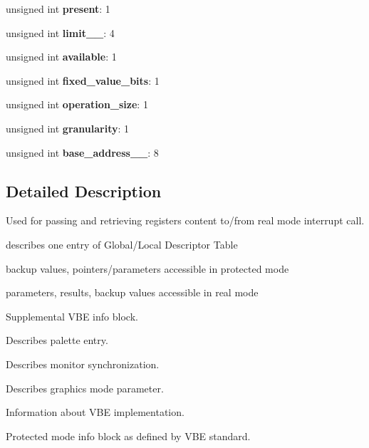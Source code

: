 \begin{DoxyCompactItemize}
unsigned int {\bfseries present}\+: 1
\item 
\mbox{\label{structRTEMS__PACKED_a52fa5625b69125080d5077fee072a4ec}} 
unsigned int {\bfseries limit\+\_\+\_}\+: 4
\item 
\mbox{\label{structRTEMS__PACKED_a65ab06c60cf82e67d5e989aa7ee6cf2e}} 
unsigned int {\bfseries available}\+: 1
\item 
\mbox{\label{structRTEMS__PACKED_a96b6c9336ce41072062f696217e41a90}} 
unsigned int {\bfseries fixed\+\_\+value\+\_\+bits}\+: 1
\item 
\mbox{\label{structRTEMS__PACKED_acee009cab698c395d443cf5c54926635}} 
unsigned int {\bfseries operation\+\_\+size}\+: 1
\item 
\mbox{\label{structRTEMS__PACKED_ad3814040f6b919bc38586f3c3c2f4dc9}} 
unsigned int {\bfseries granularity}\+: 1
\item 
\mbox{\label{structRTEMS__PACKED_a5d2fa401110e29c0ed42a0b151d53831}} 
unsigned int {\bfseries base\+\_\+address\+\_\+\_}\+: 8
\end{DoxyCompactItemize}


\subsection{Detailed Description}
Used for passing and retrieving registers content to/from real mode interrupt call. 

describes one entry of Global/\+Local Descriptor Table

backup values, pointers/parameters accessible in protected mode

parameters, results, backup values accessible in real mode

Supplemental V\+BE info block.

Describes palette entry.

Describes monitor synchronization.

Describes graphic\textquotesingle{}s mode parameter.

Information about V\+BE implementation.

Protected mode info block as defined by V\+BE standard.

